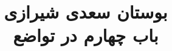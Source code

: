 \documentclass[14pt,b5paper]{article}
\begin{document}
\title{\Huge بوستان سعدی شیرازی \\
باب چهارم در تواضع}
\author{ }
\date{ }
\maketitle
\newpage
\tableofcontents
\newpage

\newpage

\newpage

\newpage

\newpage

\newpage

\newpage

\newpage

\newpage

\newpage

\newpage

\newpage

\newpage

\newpage

\newpage

\newpage

\newpage

\newpage

\newpage

\newpage

\newpage

\newpage

\newpage

\newpage

\newpage

\newpage

\newpage

\newpage

\newpage
\end{document}
